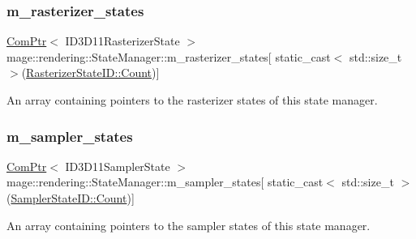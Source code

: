 \subsubsection{\texorpdfstring{m\+\_\+rasterizer\+\_\+states}{m\_rasterizer\_states}}
{\footnotesize\ttfamily \mbox{\hyperlink{namespacemage_ae74f374780900893caa5555d1031fd79}{Com\+Ptr}}$<$ I\+D3\+D11\+Rasterizer\+State $>$ mage\+::rendering\+::\+State\+Manager\+::m\+\_\+rasterizer\+\_\+states\mbox{[} static\+\_\+cast$<$ std\+::size\+\_\+t $>$(\mbox{\hyperlink{namespacemage_1_1rendering_ac878731f5dc22a3a36ccfbfc77c3facaae93f994f01c537c4e2f7d8528c3eb5e9}{Rasterizer\+State\+I\+D\+::\+Count}})\mbox{]}\hspace{0.3cm}{\ttfamily [private]}}

An array containing pointers to the rasterizer states of this state manager. \mbox{\label{classmage_1_1rendering_1_1_state_manager_a13206be2f63b38f000379599f9ed9650}} 
\subsubsection{\texorpdfstring{m\+\_\+sampler\+\_\+states}{m\_sampler\_states}}
{\footnotesize\ttfamily \mbox{\hyperlink{namespacemage_ae74f374780900893caa5555d1031fd79}{Com\+Ptr}}$<$ I\+D3\+D11\+Sampler\+State $>$ mage\+::rendering\+::\+State\+Manager\+::m\+\_\+sampler\+\_\+states\mbox{[} static\+\_\+cast$<$ std\+::size\+\_\+t $>$(\mbox{\hyperlink{namespacemage_1_1rendering_a6f80181126db61dbb8b528a6894eb658ae93f994f01c537c4e2f7d8528c3eb5e9}{Sampler\+State\+I\+D\+::\+Count}})\mbox{]}\hspace{0.3cm}{\ttfamily [private]}}

An array containing pointers to the sampler states of this state manager. 